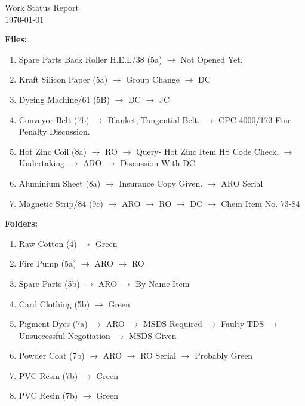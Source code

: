 \documentclass[12pt]{article}
\begin{document}
\small
\begin{center}
    Work Status Report
    \\
    {\today}
\end{center}

\noindent
\textbf{Files:}

\begin{enumerate}

\item
    Spare Parts Back Roller H.E.L/38 (5a)
$\rightarrow$
Not Opened Yet.

\item
    Kraft Silicon Paper (5a)
$\rightarrow$
Group Change
$\rightarrow$
DC

\item
    Dyeing Machine/61 (5B)
$\rightarrow$
DC
$\rightarrow$
JC

\item
    Conveyor Belt (7b)
$\rightarrow$
Blanket, Tangential Belt.
$\rightarrow$
CPC 4000/173 Fine Penalty Discussion.

\item
    Hot Zinc Coil (8a)
$\rightarrow$
RO
$\rightarrow$
Query-
Hot Zinc Item HS Code Check.
$\rightarrow$
Undertaking
$\rightarrow$
ARO
$\rightarrow$
Discussion With DC

\item
    Aluminium Sheet (8a)
$\rightarrow$
Insurance Copy Given.
$\rightarrow$
ARO Serial

\item
    Magnetic Strip/84 (9c)
$\rightarrow$
ARO
$\rightarrow$
RO
$\rightarrow$
DC
$\rightarrow$
Chem Item No. 73-84
\end{enumerate}




\noindent
\textbf{Folders:}
\begin{enumerate}
\item
    Raw Cotton (4)
$\rightarrow$
Green

\item
    Fire Pump (5a)
$\rightarrow$
ARO
$\rightarrow$
RO

\item
    Spare Parts (5b)
$\rightarrow$
ARO
$\rightarrow$
By Name Item

\item
    Card Clothing (5b)
$\rightarrow$
Green

\item
    Pigment Dyes (7a)
$\rightarrow$
ARO
$\rightarrow$
MSDS Required
$\rightarrow$
Faulty TDS
$\rightarrow$
Unsuccessful Negotiation
$\rightarrow$
MSDS Given


\item
    Powder Coat (7b)
$\rightarrow$
ARO
$\rightarrow$
RO Serial
$\rightarrow$
Probably Green

\item
    PVC Resin (7b)
$\rightarrow$
Green

\item
PVC Resin (7b)
$\rightarrow$
Green



\end{enumerate}
\end{document}
